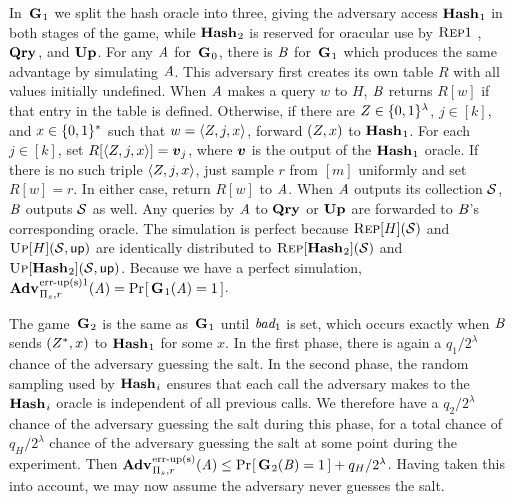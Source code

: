 {In~$\textup{\textbf{G}}\hspace{0.5pt}_1$ we split the hash oracle into three, giving the adversary access
$\textup{\textbf{Hash}}\hspace{0.5pt}_1$ in both stages of the game, while $\textup{\textbf{Hash}}\hspace{0.5pt}_2$ is reserved for oracular
use by $\textnormal{\textsc{Rep}}1$ , $\textup{\textbf{Qry}}\hspace{0.5pt}$, and $\textup{\textbf{Up}}\hspace{0.5pt}$. For any $\mathit{A}$ for~$\textup{\textbf{G}}\hspace{0.5pt}_0$, there is
$\mathit{B}$ for~$\textup{\textbf{G}}\hspace{0.5pt}_1$ which produces the same advantage by simulating $\mathit{A}$.
This adversary first creates its own table $R$ with all values initially
undefined.  When $\mathit{A}$ makes a query $w$ to $H$, $\mathit{B}$ returns $R[w]$ if
that entry in the table is defined. Otherwise, if there are $Z \in
\{0,1\}^\lambda$, $j \in [k]$, and $x \in \{0,1\}^*$ such that $w = \langle Z, j,
x\rangle$, forward $(Z,x)$ to $\textup{\textbf{Hash}}\hspace{0.5pt}_1$. For each $j \in [k]$, set
$R[\langle Z, j, x\rangle] = \boldsymbol{v}_j$, where $\boldsymbol{v}$ is the output of the
$\textup{\textbf{Hash}}\hspace{0.5pt}_1$ oracle. If there is no such triple $\langle Z, j, x\rangle$, just
sample $r$ from $[m]$ uniformly and set $R[w] = r$.
%
%
In either case, return
$R[w]$ to $\mathit{A}$. When $\mathit{A}$ outputs its collection $\mathcal{S}$, $\mathit{B}$ outputs
$\mathcal{S}$ as well. Any queries by $\mathit{A}$ to $\textup{\textbf{Qry}}\hspace{0.5pt}$ or $\textup{\textbf{Up}}\hspace{0.5pt}$ are forwarded to
$\mathit{B}$'s corresponding oracle. The simulation is perfect because
$\textnormal{\textsc{Rep}}[H](\mathcal{S})$ and $\textnormal{\textsc{Up}}[H](\mathcal{S},\mathsf{up})$ are identically distributed to
$\textnormal{\textsc{Rep}}[\textup{\textbf{Hash}}\hspace{0.5pt}_2](\mathcal{S})$ and
$\textnormal{\textsc{Up}}[\textup{\textbf{Hash}}\hspace{0.5pt}_2](\mathcal{S},\mathsf{up})$. Because we have a perfect simulation,
$\Adv{\erreps1}_{\struct_s,r}(\advA) = \Prob{\game_1(\advA) = 1}$.

The game~$\textup{\textbf{G}}\hspace{0.5pt}_2$ is the same as~$\textup{\textbf{G}}\hspace{0.5pt}_1$ until $\textit{bad}_1$ is set, which occurs
exactly when $\mathit{B}$ sends $(Z^*,x)$ to $\textup{\textbf{Hash}}\hspace{0.5pt}_1$ for some $x$. In the
first phase, there is again a $q_1/2^\lambda$ chance of the adversary guessing
the salt. In the second phase, the random sampling used by $\textup{\textbf{Hash}}\hspace{0.5pt}_i$ ensures
that each call the adversary makes to the $\textup{\textbf{Hash}}\hspace{0.5pt}_i$ oracle is independent of
all previous calls. We therefore have a $q_2/2^\lambda$ chance of the adversary
guessing the salt during this phase, for a total chance of $q_H/2^\lambda$
chance of the adversary guessing the salt at some point during the experiment.
Then $\Adv{\erreps}_{\struct_s,r}(\advA) \le \Prob{\game_2(\advB) = 1} +
q_H/2^\lambda$. Having taken this into account, we may now assume the adversary
never guesses the salt.
%



}
